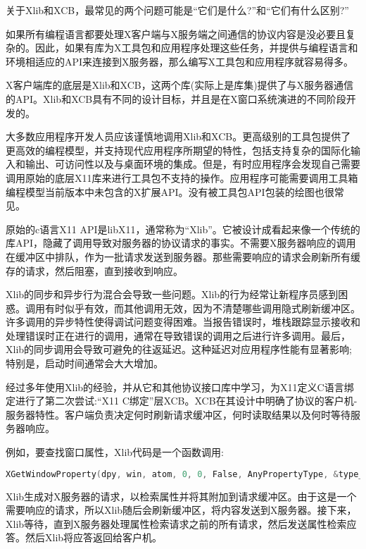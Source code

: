 关于Xlib和XCB，最常见的两个问题可能是“它们是什么?”和“它们有什么区别?”

如果所有编程语言都要处理X客户端与X服务端之间通信的协议内容是没必要且复杂的。因此，如果有库为X工具包和应用程序处理这些任务，并提供与编程语言和环境相适应的API来连接到X服务器，那么编写X工具包和应用程序就容易得多。

X客户端库的底层是Xlib和XCB，这两个库(实际上是库集)提供了与X服务器通信的API。Xlib和XCB具有不同的设计目标，并且是在X窗口系统演进的不同阶段开发的。

大多数应用程序开发人员应该谨慎地调用Xlib和XCB。更高级别的工具包提供了更高效的编程模型，并支持现代应用程序所期望的特性，包括支持复杂的国际化输入和输出、可访问性以及与桌面环境的集成。但是，有时应用程序会发现自己需要调用原始的底层X11库来进行工具包不支持的操作。应用程序可能需要调用工具箱编程模型当前版本中未包含的X扩展API。没有被工具包API包装的绘图也很常见。

原始的c语言X11 API是libX11，通常称为“Xlib”。它被设计成看起来像一个传统的库API，隐藏了调用导致对服务器的协议请求的事实。不需要X服务器响应的调用在缓冲区中排队，作为一批请求发送到服务器。那些需要响应的请求会刷新所有缓存的请求，然后阻塞，直到接收到响应。

Xlib的同步和异步行为混合会导致一些问题。Xlib的行为经常让新程序员感到困惑。调用有时似乎有效，而其他调用无效，因为不清楚哪些调用隐式刷新缓冲区。许多调用的异步特性使得调试问题变得困难。当报告错误时，堆栈跟踪显示接收和处理错误时正在进行的调用，通常在导致错误的调用之后进行许多调用。最后，Xlib的同步调用会导致可避免的往返延迟。这种延迟对应用程序性能有显著影响;特别是，启动时间通常会大大增加。

经过多年使用Xlib的经验，并从它和其他协议接口库中学习，为X11定义C语言绑定进行了第二次尝试:“X11 C绑定”层XCB。XCB在其设计中明确了协议的客户机-服务器特性。客户端负责决定何时刷新请求缓冲区，何时读取结果以及何时等待服务器响应。


\noindent 例如，要查找窗口属性，Xlib代码是一个函数调用:

\begin{lstlisting}[language=C]
XGetWindowProperty(dpy, win, atom, 0, 0, False, AnyPropertyType, &type_ret, &format_ret, &num_ret, &bytes_after, &prop_ret);
\end{lstlisting}
\vspace{-4em}

\noindent Xlib生成对X服务器的请求，以检索属性并将其附加到请求缓冲区。由于这是一个需要响应的请求，所以Xlib随后会刷新缓冲区，将内容发送到X服务器。接下来，Xlib等待，直到X服务器处理属性检索请求之前的所有请求，然后发送属性检索应答。然后Xlib将应答返回给客户机。

